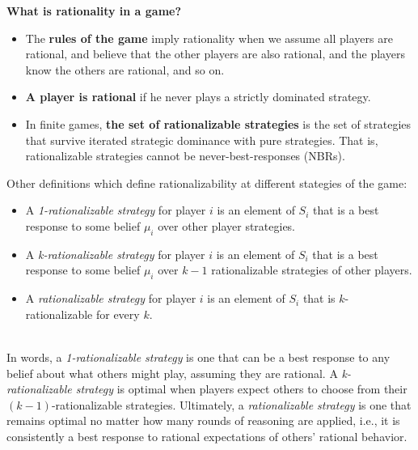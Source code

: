 \documentclass{article}
\begin{document}
\noindent \textbf{What is rationality in a game?}
\begin{itemize}
    \item The \textbf{rules of the game} imply rationality when we assume all players are rational, and believe that the other players are also rational, and the players know the others are rational, and so on. 
    \item \textbf{A player is rational} if he never plays a strictly dominated strategy.
    \item In finite games, \textbf{the set of rationalizable strategies} is the set of strategies that survive iterated strategic dominance with pure strategies. That is, rationalizable strategies cannot be never-best-responses (NBRs). 
\end{itemize} 


\noindent Other definitions which define rationalizability at different stategies of the game:
\begin{itemize}
    \item A \textit{1-rationalizable strategy} for player \( i \) is an element of \( S_i \) that is a best response to some belief \( \mu_i \) over other player strategies.
    \item A \textit{k-rationalizable strategy} for player \( i \) is an element of \( S_i \) that is a best response to some belief \( \mu_i \) over \( k-1 \) rationalizable strategies of other players.
    \item A \textit{rationalizable strategy} for player \( i \) is an element of \( S_i \) that is \( k \)-rationalizable for every \( k \).
\end{itemize} \\

In words, a \textit{1-rationalizable strategy} is one that can be a best response to any belief about what others might play, assuming they are rational. A \textit{k-rationalizable strategy} is optimal when players expect others to choose from their \( (k-1) \)-rationalizable strategies. Ultimately, a \textit{rationalizable strategy} is one that remains optimal no matter how many rounds of reasoning are applied, i.e., it is consistently a best response to rational expectations of others' rational behavior. \\ 
\end{document}

